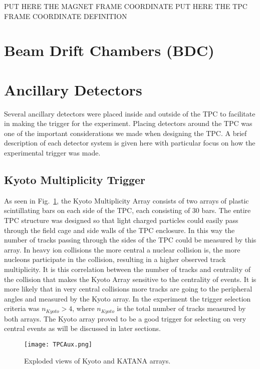 PUT HERE THE MAGNET FRAME COORDINATE 
PUT HERE THE TPC FRAME COORDINATE DEFINITION 


\section{Beam Drift Chambers (BDC)}
\label{sec:bdc}

\section{Ancillary Detectors }
Several ancillary detectors were placed inside and outside of the \spirit TPC to facilitate in making the trigger for the experiment. Placing detectors around the TPC was one of the important considerations we made when designing the TPC. A brief description of each detector system is given here with particular focus on how the experimental trigger was made. 

\subsection{Kyoto Multiplicity Trigger}
\label{sec:kyoto}
As seen in Fig.~\ref{fig:aux}, the Kyoto Multiplicity Array consists of two arrays of plastic scintillating bars on each side of the TPC, each consisting of 30 bars. The entire TPC structure was designed so that light charged particles could easily pass through the field cage and side walls of the TPC enclosure. In this way the number of tracks passing through the sides of the TPC could be measured by this array. In heavy ion collisions the more central a nuclear collision is, the more nucleons participate in the collision, resulting in a higher observed track multiplicity. It is this correlation between the number of tracks and centrality of the collision that makes the Kyoto Array sensitive to the centrality of events. It is more likely that in very central collisions more tracks are going to the peripheral angles and measured by the Kyoto array. In the experiment the trigger selection criteria was $n_{Kyoto} > 4$, where $n_{Kyoto}$ is the total number of tracks measured by both arrays. The Kyoto array proved to be a good trigger for selecting on very central events as will be discussed in later sections. 

\begin{figure}[!htb]
\texttt{[image: TPCAux.png]}
\caption{Exploded views of Kyoto and KATANA arrays.}
\label{fig:aux}
\end{figure}


